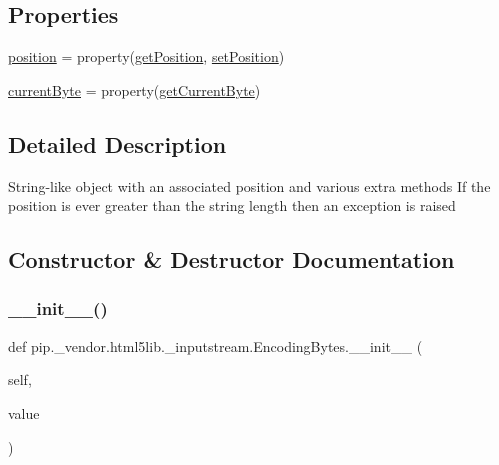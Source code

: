 \subsection*{Properties}
\begin{DoxyCompactItemize}
\item 
\hyperlink{classpip_1_1__vendor_1_1html5lib_1_1__inputstream_1_1EncodingBytes_a15d3dcc692c2d97e8988082b2b21ebbd}{position} = property(\hyperlink{classpip_1_1__vendor_1_1html5lib_1_1__inputstream_1_1EncodingBytes_a12c343802ad385d8c1fc0312dc53e946}{get\+Position}, \hyperlink{classpip_1_1__vendor_1_1html5lib_1_1__inputstream_1_1EncodingBytes_a92f1071710b0a4c5c8524a1821fe698b}{set\+Position})
\item 
\hyperlink{classpip_1_1__vendor_1_1html5lib_1_1__inputstream_1_1EncodingBytes_a4d598a4b0b9cfb510780b32eca636522}{current\+Byte} = property(\hyperlink{classpip_1_1__vendor_1_1html5lib_1_1__inputstream_1_1EncodingBytes_af4c58082bbb3647784ff91b89c730ce8}{get\+Current\+Byte})
\end{DoxyCompactItemize}


\subsection{Detailed Description}
\begin{DoxyVerb}String-like object with an associated position and various extra methods
If the position is ever greater than the string length then an exception is
raised\end{DoxyVerb}
 

\subsection{Constructor \& Destructor Documentation}
\mbox{\label{classpip_1_1__vendor_1_1html5lib_1_1__inputstream_1_1EncodingBytes_a0706975caca24c4aa25964d4e15b6e3d}} 
\subsubsection{\texorpdfstring{\+\_\+\+\_\+init\+\_\+\+\_\+()}{\_\_init\_\_()}}
{\footnotesize\ttfamily def pip.\+\_\+vendor.\+html5lib.\+\_\+inputstream.\+Encoding\+Bytes.\+\_\+\+\_\+init\+\_\+\+\_\+ (\begin{DoxyParamCaption}\item[{}]{self,  }\item[{}]{value }\end{DoxyParamCaption})}



